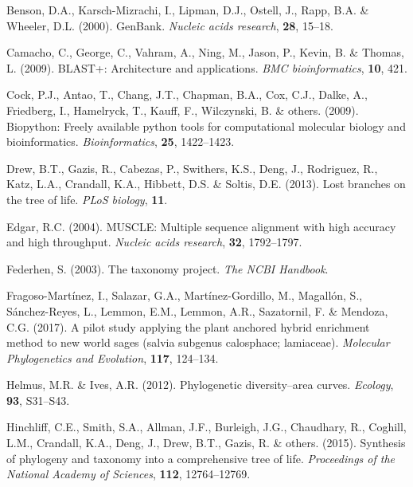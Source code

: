 \documentclass[]{article}
\begin{document}
\leavevmode\hypertarget{ref-benson2000genbank}{}%
Benson, D.A., Karsch-Mizrachi, I., Lipman, D.J., Ostell, J., Rapp, B.A. \& Wheeler, D.L. (2000). GenBank. \emph{Nucleic acids research}, \textbf{28}, 15--18.

\leavevmode\hypertarget{ref-camacho2009blast}{}%
Camacho, C., George, C., Vahram, A., Ning, M., Jason, P., Kevin, B. \& Thomas, L. (2009). BLAST+: Architecture and applications. \emph{BMC bioinformatics}, \textbf{10}, 421.

\leavevmode\hypertarget{ref-cock2009biopython}{}%
Cock, P.J., Antao, T., Chang, J.T., Chapman, B.A., Cox, C.J., Dalke, A., Friedberg, I., Hamelryck, T., Kauff, F., Wilczynski, B. \& others. (2009). Biopython: Freely available python tools for computational molecular biology and bioinformatics. \emph{Bioinformatics}, \textbf{25}, 1422--1423.

\leavevmode\hypertarget{ref-drew2013lost}{}%
Drew, B.T., Gazis, R., Cabezas, P., Swithers, K.S., Deng, J., Rodriguez, R., Katz, L.A., Crandall, K.A., Hibbett, D.S. \& Soltis, D.E. (2013). Lost branches on the tree of life. \emph{PLoS biology}, \textbf{11}.

\leavevmode\hypertarget{ref-edgar2004muscle}{}%
Edgar, R.C. (2004). MUSCLE: Multiple sequence alignment with high accuracy and high throughput. \emph{Nucleic acids research}, \textbf{32}, 1792--1797.

\leavevmode\hypertarget{ref-federhen2003taxonomy}{}%
Federhen, S. (2003). The taxonomy project. \emph{The NCBI Handbook}.

\leavevmode\hypertarget{ref-fragoso2017pilot}{}%
Fragoso-Martínez, I., Salazar, G.A., Martínez-Gordillo, M., Magallón, S., Sánchez-Reyes, L., Lemmon, E.M., Lemmon, A.R., Sazatornil, F. \& Mendoza, C.G. (2017). A pilot study applying the plant anchored hybrid enrichment method to new world sages (salvia subgenus calosphace; lamiaceae). \emph{Molecular Phylogenetics and Evolution}, \textbf{117}, 124--134.

\leavevmode\hypertarget{ref-helmus2012phylogenetic}{}%
Helmus, M.R. \& Ives, A.R. (2012). Phylogenetic diversity--area curves. \emph{Ecology}, \textbf{93}, S31--S43.

\leavevmode\hypertarget{ref-hinchliff2015synthesis}{}%
Hinchliff, C.E., Smith, S.A., Allman, J.F., Burleigh, J.G., Chaudhary, R., Coghill, L.M., Crandall, K.A., Deng, J., Drew, B.T., Gazis, R. \& others. (2015). Synthesis of phylogeny and taxonomy into a comprehensive tree of life. \emph{Proceedings of the National Academy of Sciences}, \textbf{112}, 12764--12769.
\end{document}
